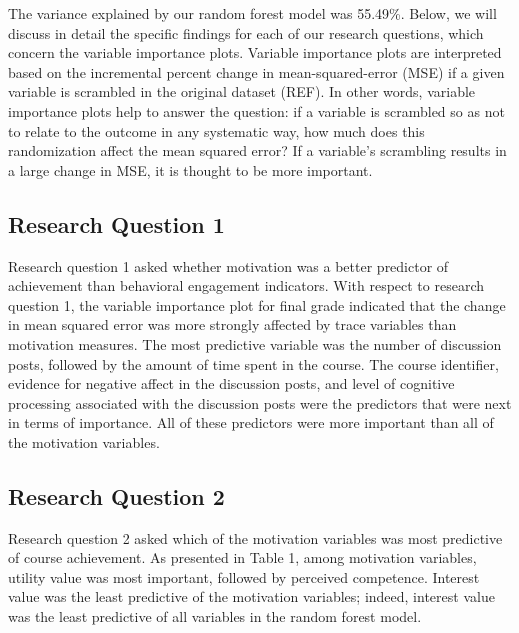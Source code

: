 \documentclass[acmart]{apa6}
\theoremstyle{definition}
\theoremstyle{definition}
\theoremstyle{definition}
\theoremstyle{remark}
\begin{document}
The variance explained by our random forest model was 55.49\%. Below, we
will discuss in detail the specific findings for each of our research
questions, which concern the variable importance plots. Variable
importance plots are interpreted based on the incremental percent change
in mean-squared-error (MSE) if a given variable is scrambled in the
original dataset (REF). In other words, variable importance plots help
to answer the question: if a variable is scrambled so as not to relate
to the outcome in any systematic way, how much does this randomization
affect the mean squared error? If a variable's scrambling results in a
large change in MSE, it is thought to be more important.

\subsection{Research Question 1}\label{research-question-1}

Research question 1 asked whether motivation was a better predictor of
achievement than behavioral engagement indicators. With respect to
research question 1, the variable importance plot for final grade
indicated that the change in mean squared error was more strongly
affected by trace variables than motivation measures. The most
predictive variable was the number of discussion posts, followed by the
amount of time spent in the course. The course identifier, evidence for
negative affect in the discussion posts, and level of cognitive
processing associated with the discussion posts were the predictors that
were next in terms of importance. All of these predictors were more
important than all of the motivation variables.

\subsection{Research Question 2}\label{research-question-2}

Research question 2 asked which of the motivation variables was most
predictive of course achievement. As presented in Table 1, among
motivation variables, utility value was most important, followed by
perceived competence. Interest value was the least predictive of the
motivation variables; indeed, interest value was the least predictive of
all variables in the random forest model.
\end{document}
